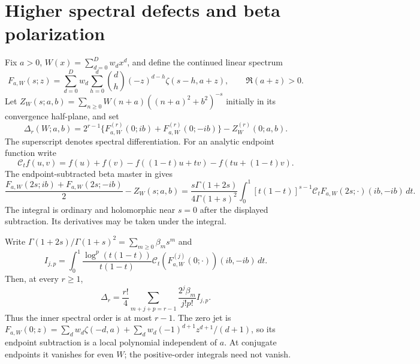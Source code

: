 \section{Higher spectral defects and beta polarization}
\label{hsd:int:section}
Fix $a>0$, $W(x)=\sum_{d=0}^D w_dx^d$, and define the continued linear spectrum
\[
 F_{a,W}(s;z)=\sum_{d=0}^D w_d\sum_{h=0}^d
     \binom dh(-z)^{d-h}\zeta(s-h,a+z),\qquad \Re(a+z)>0.
\]
Let $Z_W(s;a,b)=\sum_{n\ge0}W(n+a)((n+a)^2+b^2)^{-s}$ initially in its
convergence half-plane, and set
\[
 \Delta_r(W;a,b)=2^{r-1}\{F_{a,W}^{(r)}(0;ib)+F_{a,W}^{(r)}(0;-ib)\}
                                      -Z_W^{(r)}(0;a,b).
\]
The superscript denotes spectral differentiation.
For an analytic endpoint function write
\[
 \mathcal C_t f(u,v)=f(u)+f(v)-f((1-t)u+tv)-f(tu+(1-t)v).
\]
The endpoint-subtracted beta master in \cite{hsd:continuation} gives
\begin{equation}\label{hsd:int:beta}
 \frac{F_{a,W}(2s;ib)+F_{a,W}(2s;-ib)}2-Z_W(s;a,b)
 =\frac{s\Gamma(1+2s)}{4\Gamma(1+s)^2}
 \int_0^1[t(1-t)]^{s-1}\mathcal C_tF_{a,W}(2s;\cdot)(ib,-ib)\,dt.
\end{equation}
The integral is ordinary and holomorphic near $s=0$ after the displayed
subtraction. Its derivatives may be taken under the integral.

Write $\Gamma(1+2s)/\Gamma(1+s)^2=\sum_{m\ge0}\beta_ms^m$ and
\[
 I_{j,p}=\int_0^1\frac{\log^p(t(1-t))}{t(1-t)}
          \mathcal C_t(F_{a,W}^{(j)}(0;\cdot))(ib,-ib)\,dt.
\]
Then, at every $r\ge1$,
\begin{equation}\label{hsd:int:alljets}
 \Delta_r=\frac{r!}{4}\sum_{m+j+p=r-1}\frac{2^j\beta_m}{j!p!}I_{j,p}.
\end{equation}
Thus the inner spectral order is at most $r-1$.
The zero jet is
$F_{a,W}(0;z)=\sum_dw_d\zeta(-d,a)+\sum_dw_d(-1)^{d+1}z^{d+1}/(d+1)$,
so its endpoint subtraction is a local polynomial independent of $a$.
At conjugate endpoints it vanishes for even $W$; the positive-order
integrals need not vanish.

